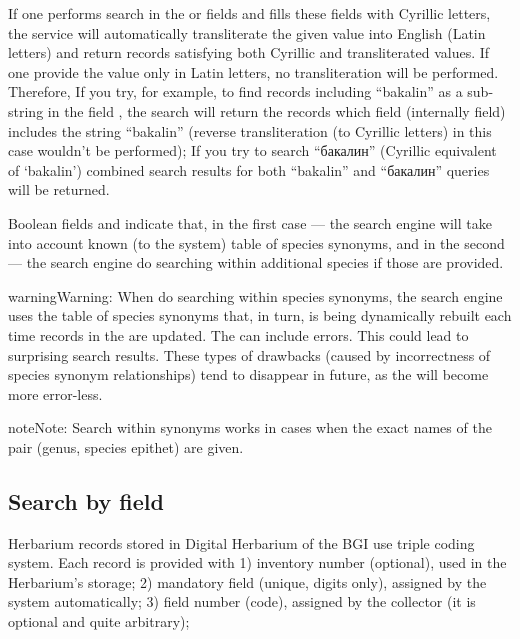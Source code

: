 \documentclass[letterpaper,10pt,english]{sphinxmanual}
\begin{document}
If one performs search in the   or  fields
and fills these fields with Cyrillic letters, the service will automatically
transliterate the given value into English (Latin letters)
and return records satisfying both Cyrillic and transliterated values.
If one provide the value only in Latin letters, no transliteration will be performed.
Therefore,
If you try, for example,
to find records including “bakalin” as a sub-string in the field ,
the search  will return the records which field  (internally  field)
includes the string “bakalin” (reverse transliteration (to Cyrillic letters)
in this case wouldn’t be performed);
If you try to search “бакалин” (Cyrillic equivalent of ‘bakalin’) combined
search results for both “bakalin” and “бакалин” queries will be returned.

Boolean fields  and 
indicate that, in the first case — the search engine will take into account known (to the system)
table of species synonyms, and in the second — the search engine do searching within additional species
if those are provided.

\begin{sphinxadmonition}{warning}{Warning:}
When do searching within species synonyms, the search engine uses the table of species synonyms that,
in turn, is being dynamically rebuilt each time records in the  are updated. The  can include errors. This could lead
to surprising search results. These types of drawbacks (caused by incorrectness of species synonym
relationships) tend to disappear in future, as the 
will become more error-less.
\end{sphinxadmonition}

\begin{sphinxadmonition}{note}{Note:}
Search within synonyms works in cases when the exact names of the pair (genus, species epithet)
are given.
\end{sphinxadmonition}


\subsection{Search by  field}
\label{\detokenize{search_basics:search-by-code-field}}
Herbarium records stored in Digital Herbarium of the BGI use triple coding system.
Each record is provided with 1) inventory number (optional), used in the Herbarium’s storage;
2) mandatory  field (unique, digits only), assigned by the system automatically;
3) field number (code), assigned by the collector (it is optional and quite arbitrary);
\end{document}
